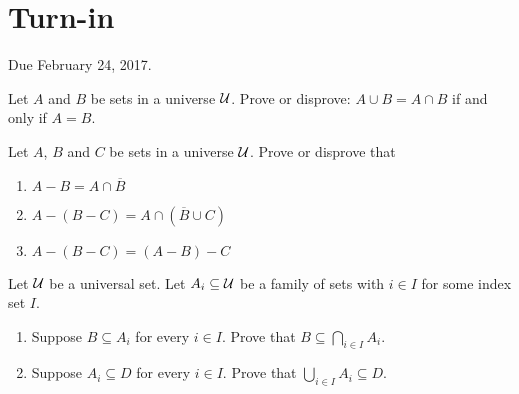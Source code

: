 \documentclass[12pt]{article}
\begin{document}
\newpage
\section{Turn-in} 

Due February 24, 2017.



\begin{qu}
Let $A$ and $B$ be sets in a universe $\mathcal{U}$.
Prove or disprove: $A \cup B = A\cap B$ if and only if $A=B$.

\end{qu}


\begin{qu}
Let $A$, $B$ and $C$ be sets in a universe $\mathcal{U}$. Prove or disprove that
\begin{enumerate}[label=\alph*)]
\item $A-B=A\cap \overline{B}$
\item $A-(B-C)=A\cap (\overline{B} \cup C)$
\item $A-(B-C)=(A-B)-C$
\end{enumerate}
\end{qu}

\begin{qu}
Let $\mathcal{U}$ be a universal set. Let $A_i \subseteq \mathcal{U}$ be a family of sets with $i \in I$ for some index set $I$.
\begin{enumerate}[label=\alph*)]
\item Suppose $B \subseteq A_i$ for every $i \in I$. Prove that $B \subseteq \bigcap_{i \in I} A_i$.
\item Suppose $A_i \subseteq D$ for every $i \in I$. Prove that $\bigcup_{i \in I} A_i \subseteq D$.
\end{enumerate}
\end{qu}
\end{document}

